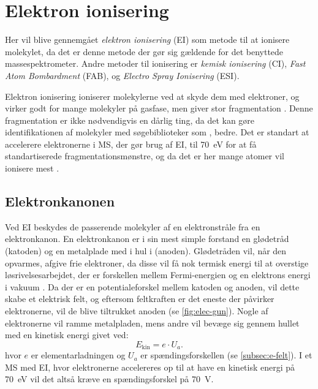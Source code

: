 \section{Elektron ionisering}\label{sec:electronion}
Her vil blive gennemgået \emph{elektron ionisering} (EI) som metode til at ionisere molekylet, da det er denne metode der gør sig gældende for det benyttede massespektrometer. %
Andre metoder til ionisering er \emph{kemisk ionisering} (CI), \emph{Fast Atom Bombardment} (FAB), og \emph{Electro Spray Ionisering} (ESI)\space\parencite{msionization}.
\par Elektron ionisering ioniserer molekylerne ved at skyde dem med elektroner, og virker godt for mange molekyler på gasfase, men giver stor fragmentation \parencite{massspec}.
Denne fragmentation er ikke nødvendigvis en dårlig ting, da det kan gøre identifikationen af molekyler med søgebiblioteker som \textcite{nist23}, bedre.
Det er standart at accelerere elektronerne i MS, der gør brug af EI, til \qty{70}{\eV} for at få standartiserede fragmentationsmønstre, og da det er her mange atomer vil ionisere mest \parencite{massspec}.
\subsection{Elektronkanonen}

Ved EI beskydes de passerende molekyler af en elektronstråle fra en elektronkanon.
En elektronkanon er i sin mest simple forstand en glødetråd (katoden) og en metalplade med i hul i (anoden)\space\parencite{orbitAstx}.
Glødetråden vil, når den opvarmes, afgive frie elektroner, da disse vil få nok termisk energi til at overstige løsrivelsesarbejdet, der er forskellen mellem Fermi-energien\footnotemark{} og en elektrons energi i vakuum \parencite{electronmicroscopy}.
Da der er en potentialeforskel mellem katoden og anoden, vil dette skabe et elektrisk felt, og eftersom feltkraften er det eneste der påvirker elektronerne, vil de blive tiltrukket anoden (se \cref{fig:elec-gun}).
Nogle af elektronerne vil ramme metalpladen, mens andre vil bevæge sig gennem hullet med en kinetisk energi givet ved:
\begin{equation}
	E_{\text{kin}} = e \cdot U_a .
\end{equation}
hvor $e$ er elementarladningen og $U_a$ er spændingsforskellen (se \cref{subsec:e-felt})\space\parencite{grundfysA}.
I et MS med EI, hvor elektronerne accelereres op til at have en kinetisk energi på \qty{70}{\eV} vil det altså kræve en spændingsforskel på \qty{70}{\volt}.
